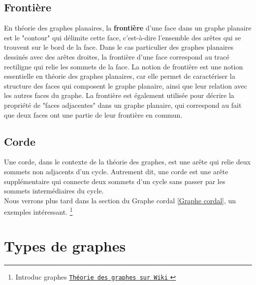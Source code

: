 \documentclass[hidelinks,letterpaper,12pt]{article}
\begin{document}
\bigbreak 
\subsection{Frontière}
\label{Frontière}
En théorie des graphes planaires, la \textbf{frontière} d'une face dans un graphe planaire est le "contour" qui délimite cette face, c'est-à-dire l'ensemble des arêtes qui se trouvent sur le bord de la face. Dans le cas particulier des graphes planaires dessinés avec des arêtes droites, la frontière d'une face correspond au tracé rectiligne qui relie les sommets de la face. La notion de frontière est une notion essentielle en théorie des graphes planaires, car elle permet de caractériser la structure des faces qui composent le graphe planaire, ainsi que leur relation avec les autres faces du graphe. La frontière est également utilisée pour décrire la propriété de "faces adjacentes" dans un graphe planaire, qui correspond au fait que deux faces ont une partie de leur frontière en commun.	

\subsection{Corde}
\label{Corde}
Une corde, dans le contexte de la théorie des graphes, est une arête qui relie deux sommets non adjacents d'un cycle. Autrement dit, une corde est une arête supplémentaire qui connecte deux sommets d'un cycle sans passer par les sommets intermédiaires du cycle.
\\ 
Nous verrons plus tard dans la section du Graphe cordal \ref{Graphe cordal}, un exemples intéressant.
\footnote{ Introduc graphes 
\href{https://fr.wikipedia.org/wiki/Cycle_(th\%C3\%A9orie_des_graphes)}     
{\texttt{Théorie des graphes sur Wiki} }  }
\bigbreak  
\section{Types de graphes}
\label{Les types de graphes}
\end{document}
